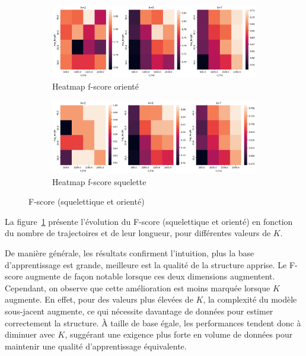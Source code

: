 \documentclass{article}
\begin{document}
\begin{figure}[ht]
    \centering
    \begin{subfigure}{\linewidth}
        \centering
        \includegraphics[width=\linewidth]{img/fscore.png}
        \caption{Heatmap f-score orienté}
    \end{subfigure}
    \begin{subfigure}{\linewidth}
        \centering
        \includegraphics[width=\linewidth]{img/sk-fscore.png}
        \caption{Heatmap f-score squelette }
    \end{subfigure}
    \caption{F-score (squelettique et orienté)}
    \label{fig:f-score}
\end{figure}


La figure~\ref{fig:f-score} présente l'évolution du F-score (squelettique et orienté) en fonction
du nombre de trajectoires et de leur longueur, pour différentes valeurs de $K$.

De manière générale, les résultats confirment l'intuition, plus la base d'apprentissage est grande,
meilleure est la qualité de la structure apprise. Le F-score augmente de façon notable lorsque ces deux dimensions
augmentent. Cependant, on observe que cette amélioration est moins marquée lorsque $K$ augmente. En effet,
pour des valeurs plus élevées de $K$, la complexité du modèle sous-jacent augmente, ce qui nécessite davantage de
données pour estimer correctement la structure. À taille de base égale, les performances tendent donc à diminuer
avec $K$, suggérant une exigence plus forte en volume de données pour maintenir une qualité d'apprentissage équivalente.
\end{document}
